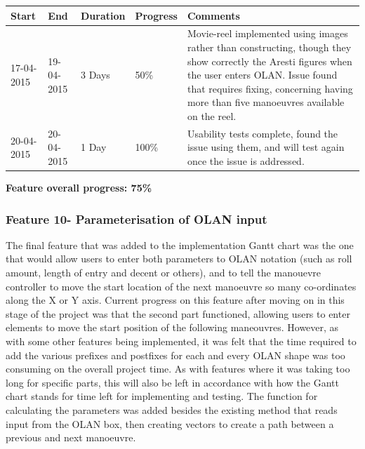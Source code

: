 \begin{table}[h]
\begin{tabular}{|l|l|l|l|p{7cm}|}
\hline
\textbf{Start} & \textbf{End} & \textbf{Duration} & \textbf{Progress} & \textbf{Comments}                                                                                                     \\ \hline
17-04-2015     & 19-04-2015   & 3 Days            & 50\%             &  Movie-reel implemented using images rather than constructing, though they show correctly the Aresti figures when the user enters OLAN. Issue found that requires fixing, concerning having more than five manoeuvres available on the reel.\\ \hline
20-04-2015     & 20-04-2015   & 1 Day            & 100\%             &  Usability tests complete, found the issue using them, and will test again once the issue is addressed.\\ \hline
\end{tabular}
\end{table}

\textbf{Feature overall progress: 75\%}

\subsubsection{Feature 10- Parameterisation of OLAN input}
The final feature that was added to the implementation Gantt chart was the one that would allow users to enter both parameters to OLAN notation (such as roll amount, length of entry and decent or others), and to tell the manouevre controller to move the start location of the next manoeuvre so many co-ordinates along the X or Y axis. Current progress on this feature after moving on in this stage of the project was that the second part functioned, allowing users to enter elements to move the start position of the following maneouvres. However, as with some other features being implemented, it was felt that the time required to add the various prefixes and postfixes for each and every OLAN shape was too consuming on the overall project time. As with features where it was taking too long for specific parts, this will also be left in accordance with how the Gantt chart stands for time left for implementing and testing. The function for calculating the parameters was added besides the existing method that reads input from the OLAN box, then creating vectors to create a path between a previous and next manoeuvre.

